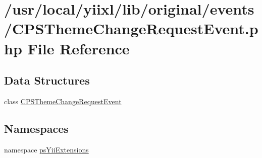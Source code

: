 \hypertarget{CPSThemeChangeRequestEvent_8php}{
\section{/usr/local/yiixl/lib/original/events/CPSThemeChangeRequestEvent.php File Reference}
\label{CPSThemeChangeRequestEvent_8php}
}
\subsection*{Data Structures}
\begin{DoxyCompactItemize}
\item 
class \hyperlink{classCPSThemeChangeRequestEvent}{CPSThemeChangeRequestEvent}
\end{DoxyCompactItemize}
\subsection*{Namespaces}
\begin{DoxyCompactItemize}
\item 
namespace \hyperlink{namespacepsYiiExtensions}{psYiiExtensions}
\end{DoxyCompactItemize}
